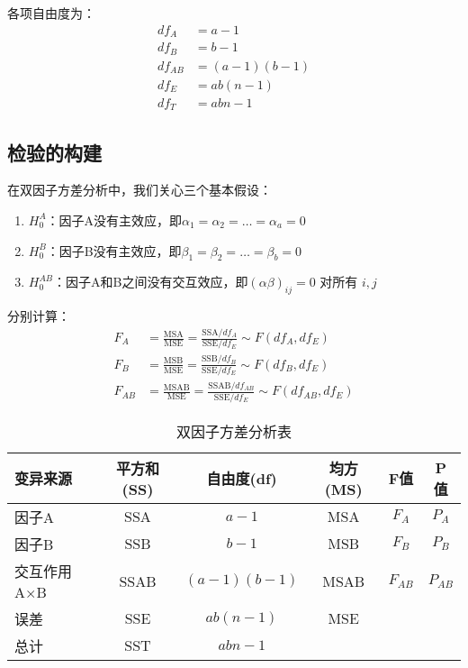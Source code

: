 \documentclass[12pt, a4paper]{amsart}
\begin{document}
各项自由度为：
\begin{align*}
df_A &= a - 1 \\
df_B &= b - 1 \\
df_{AB} &= (a-1)(b-1) \\
df_E &= ab(n-1) \\
df_T &= abn - 1
\end{align*}

\subsection{检验的构建}
在双因子方差分析中，我们关心三个基本假设：

\begin{enumerate}
    \item $H_0^{A}$：因子A没有主效应，即$\alpha_1 = \alpha_2 = \ldots = \alpha_a = 0$
    \item $H_0^{B}$：因子B没有主效应，即$\beta_1 = \beta_2 = \ldots = \beta_b = 0$
    \item $H_0^{AB}$：因子A和B之间没有交互效应，即$(\alpha\beta)_{ij} = 0$ 对所有 $i,j$
\end{enumerate}

分别计算：
\begin{align*}
F_A &= \frac{\text{MSA}}{\text{MSE}} = \frac{\text{SSA}/df_A}{\text{SSE}/df_E} \sim F(df_A, df_E) \\
F_B &= \frac{\text{MSB}}{\text{MSE}} = \frac{\text{SSB}/df_B}{\text{SSE}/df_E} \sim F(df_B, df_E) \\
F_{AB} &= \frac{\text{MSAB}}{\text{MSE}} = \frac{\text{SSAB}/df_{AB}}{\text{SSE}/df_E} \sim F(df_{AB}, df_E)
\end{align*}

\begin{table}[h!]
\centering
\caption{双因子方差分析表}
\begin{tabular}{lccccc}
\toprule
\textbf{变异来源} & \textbf{平方和(SS)} & \textbf{自由度(df)} & \textbf{均方(MS)} & \textbf{F值} & \textbf{P值} \\
\midrule
因子A & SSA & $a-1$ & MSA & $F_A$ & $P_A$ \\
因子B & SSB & $b-1$ & MSB & $F_B$ & $P_B$ \\
交互作用A×B & SSAB & $(a-1)(b-1)$ & MSAB & $F_{AB}$ & $P_{AB}$ \\
误差 & SSE & $ab(n-1)$ & MSE & & \\
\midrule
总计 & SST & $abn-1$ & & & \\
\bottomrule
\end{tabular}
\end{table}
\end{document}
